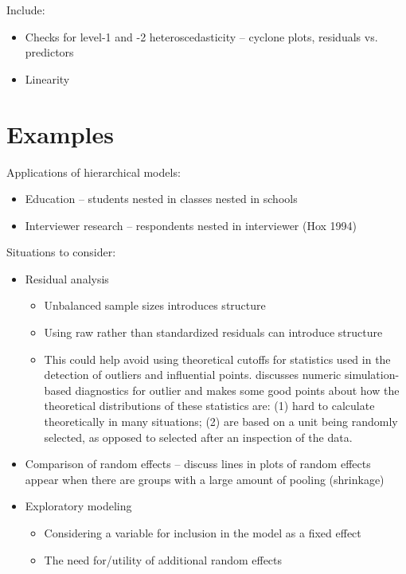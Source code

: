 \documentclass{article} %
\begin{document}
Include:
\begin{itemize}
\item Checks for level-1 and -2 heteroscedasticity -- cyclone plots, residuals vs. predictors
\item Linearity

\end{itemize}


\section{Examples}
Applications of hierarchical models:
\begin{itemize}
\item Education -- students nested in classes nested in schools
\item Interviewer research -- respondents nested in interviewer (Hox 1994)
\end{itemize}

Situations to consider:
\begin{itemize}
\item Residual analysis
	\begin{itemize}
	\item Unbalanced sample sizes introduces structure
	\item Using raw rather than standardized residuals can introduce structure
	\item This could help avoid using theoretical cutoffs for statistics used in the detection of outliers and influential points. \cite{Longford:2001wy} discusses numeric simulation-based diagnostics for outlier and makes some good points about how the theoretical distributions of these statistics are: (1) hard to calculate theoretically in many situations; (2) are based on a unit being randomly selected, as opposed to selected after an inspection of the data.
	\end{itemize}

\item Comparison of random effects -- \cite{Morrell:2000ve} discuss lines in plots of random effects appear when there are groups with a large amount of pooling (shrinkage)

\item Exploratory modeling
	\begin{itemize}
	\item Considering a variable for inclusion in the model as a fixed effect
	\item The need for/utility of additional random effects
	
	\end{itemize}


\end{itemize}
\end{document}
